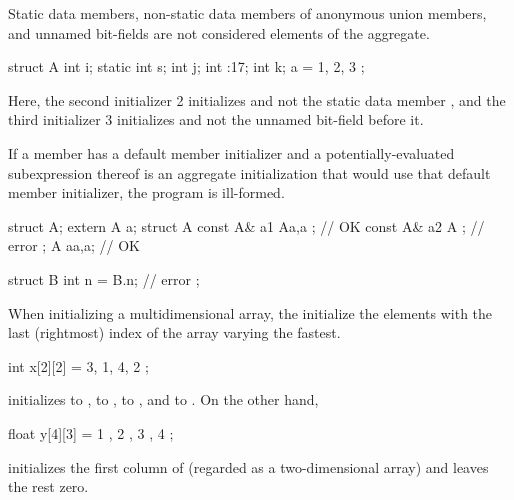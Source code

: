 \pnum
\begin{note}
Static data members,
non-static data members of anonymous union members,
and
unnamed bit-fields
are not considered elements of the aggregate.
\begin{example}
\begin{codeblock}
struct A {
  int i;
  static int s;
  int j;
  int :17;
  int k;
} a = { 1, 2, 3 };
\end{codeblock}

Here, the second initializer 2 initializes
and not the static data member
, and the third initializer 3 initializes 
and not the unnamed bit-field before it.
\end{example}
\end{note}

\pnum
If a member has a default member initializer
and a potentially-evaluated subexpression thereof is an aggregate
initialization that would use that default member initializer,
the program is ill-formed.
\begin{example}
\begin{codeblock}
struct A;
extern A a;
struct A {
  const A& a1 { A{a,a} };       // OK
  const A& a2 { A{} };          // error
};
A a{a,a};                       // OK

struct B {
  int n = B{}.n;                // error
};
\end{codeblock}
\end{example}

\pnum
When initializing a multidimensional array,
the
initialize the elements with the last (rightmost) index of the array
varying the fastest.
\begin{example}
\begin{codeblock}
int x[2][2] = { 3, 1, 4, 2 };
\end{codeblock}
initializes
to
,
to
,
to
,
and
to
.
On the other hand,
\begin{codeblock}
float y[4][3] = {
  { 1 }, { 2 }, { 3 }, { 4 }
};
\end{codeblock}
initializes the first column of
(regarded as a two-dimensional array)
and leaves the rest zero.
\end{example}

